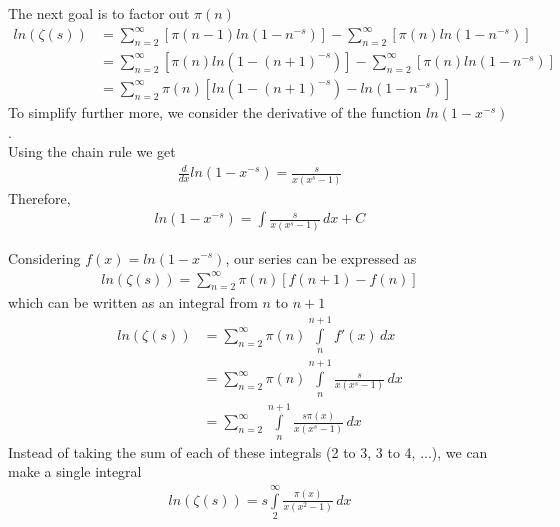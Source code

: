 \documentclass{article}
\begin{document}
The next goal is to factor out $\pi (n)$
\begin{align*}
    ln\left(\zeta(s)\right)
    &=\sum_{n=2}^{\infty}\left[\pi (n-1)ln\left(1-n^{-s}\right)\right]
    -\sum_{n=2}^{\infty}\left[\pi (n)ln\left(1-n^{-s}\right)\right]
    \\&=\sum_{n=2}^{\infty}\left[\pi (n)ln\left(1-(n+1)^{-s}\right)\right]
    -\sum_{n=2}^{\infty}\left[\pi (n)ln\left(1-n^{-s}\right)\right]
    \\
    &=\sum_{n=2}^{\infty}\pi (n)\left[ln\left(1-(n+1)^{-s}\right)-ln\left(1-n^{-s}\right)\right]
\end{align*}
To simplify further more, we consider the derivative of the function $ln(1-x^{-s})$.
\\
Using the chain rule we get
\begin{align*}
    \frac{d}{dx}ln(1-x^{-s})=
    \frac{s}{x(x^s-1)}
\end{align*}
Therefore,
\begin{align*}
    ln(1-x^{-s})=
    \int \frac{s}{x(x^s-1)}\,dx+C
\end{align*}

Considering $f(x)=ln(1-x^{-s})$, our series can be expressed as
\begin{align*}
    ln\left(\zeta(s)\right)=
    \sum_{n=2}^{\infty}\pi(n)\left[f(n+1)-f(n)\right]
\end{align*}
which can be written as an integral from $n$ to $n+1$
\begin{align*}
    ln\left(\zeta(s)\right)&=
    \sum_{n=2}^{\infty}\pi(n)
    \int\limits_n^{n+1} f'(x)\,dx
    \\
    &=
    \sum_{n=2}^{\infty}\pi(n)
    \int\limits_n^{n+1}
    \frac{s}{x(x^s-1)}\,dx
    \\
    &=
    \sum_{n=2}^{\infty}
    \int\limits_n^{n+1}
    \frac{s\pi(x)}{x(x^s-1)}\,dx
\end{align*}
Instead of taking the sum of each of these integrals (2 to 3, 3 to 4, ...), we can make a single integral
\begin{align*}
    ln\left(\zeta(s)\right)=
    s\int\limits_2^\infty
    \frac{\pi(x)}{x(x^2-1)}\,dx
\end{align*}
\end{document}
